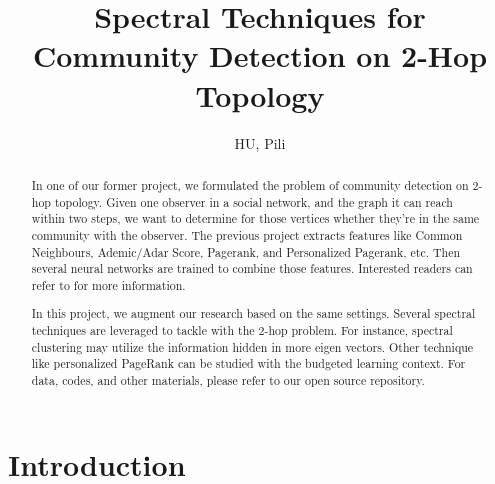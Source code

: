\documentclass[11pt,a4paper]{article}
\author{HU, Pili}
\title{Spectral Techniques for Community Detection on 2-Hop Topology}
\begin{document}
\maketitle

\begin{abstract}
	In one of our former project\cite{hu2011-cd2hop}, we formulated
	the problem of community detection on 2-hop topology. Given 
	one observer in a social network, and the graph it can reach 
	within two steps, we want to determine for those vertices whether they're
	in the same community with the observer. 
	The previous project extracts features like Common Neighbours, Ademic/Adar
	Score, Pagerank, and Personalized Pagerank, etc. Then several neural 
	networks are trained to combine those features. 
	Interested readers can refer to \cite{hu2011-cd2hop}
	for more information.  
	
	In this project, we augment our research based on the same settings. 
	Several spectral techniques are leveraged to tackle with the 2-hop 
	problem. For instance, spectral clustering may utilize the information 
	hidden in more eigen vectors. Other technique like personalized PageRank 
	can be studied with the budgeted learning context. 
	For data, codes, and other materials, please refer to 
	our open source repository\cite{hu2012-spectral2hop}. 
\end{abstract}

\pagebreak
\tableofcontents
\pagebreak

\section{Introduction}
\end{document}

